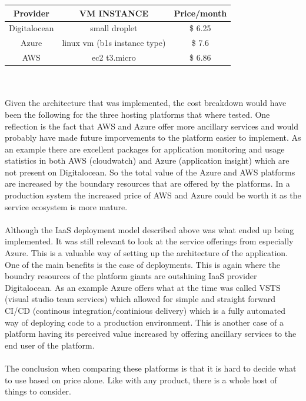 \documentclass[]{uiophd}
\begin{document}
\begin{center}
 \begin{tabular}{||c | c | c ||} 
 \hline
 Provider & VM INSTANCE & Price/month \\ [0.5ex] 
 \hline\hline
 Digitalocean & small droplet & \$ 6.25 \\ 
 \hline
 Azure & linux vm (b1s instance type) &\$ 7.6 \\
 \hline
 AWS & ec2 t3.micro &\$ 6.86 \\
 \hline
\end{tabular}
\end{center}
\\\\
Given the architecture that was implemented, the cost breakdown would have been the following for the three hosting platforms that where tested. One reflection is the fact that AWS and Azure offer more ancillary services and would probably have made future imporvements to the platform easier to implement. As an example there are excellent packages for application monitoring and usage statistics in both AWS (cloudwatch) and Azure (application insight) which are not present on Digitalocean. So the total value of the Azure and AWS platforms are increased by the boundary resources that are offered by the platforms. In a production system the increased price of AWS and Azure could be worth it as the service ecosystem is more mature. 
\\\\
Although the IaaS deployment model described above was what ended up being implemented. It was still relevant to look at the service offerings from especially Azure. This is a valuable way of setting up the architecture of the application. One of the main benefits is the ease of deployments. This is again where the boundry resources of the platform giants are outshining IaaS provider Digitalocean. As an example Azure offers what at the time was called VSTS (visual studio team services) which allowed for simple and straight forward CI/CD (continous integration/continious delivery) which is a fully automated way of deploying code to a production environment. This is another case of a platform having its perceived value increased by offering ancillary services to the end user of the platform. 
\\\\
The conclusion when comparing these platforms is that it is hard to decide what to use based on price alone. Like with any product, there is a whole host of things to consider.
\end{document}
